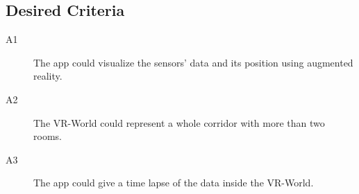 \subsection{Desired Criteria}

\begin{description}
  \item[A1] The app could visualize the sensors' data and its position using augmented reality.
  \item[A2] The VR-World could represent a whole corridor with more than two rooms.
  \item[A3] The app could give a time lapse of the data inside the VR-World.
\end{description}
